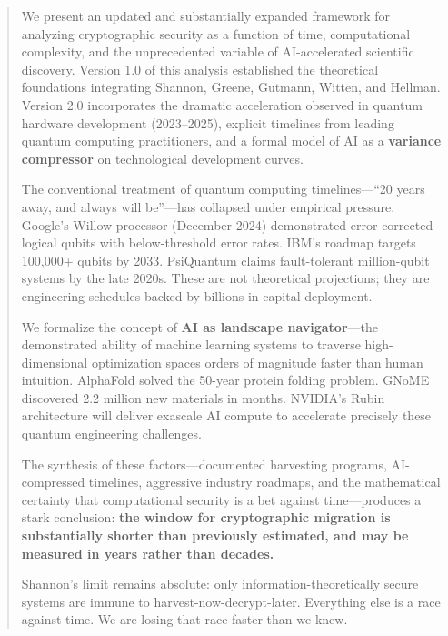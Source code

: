 \documentclass[11pt,a4paper]{article}
\begin{document}
\begin{abstract}
We present an updated and substantially expanded framework for analyzing cryptographic security as a function of time, computational complexity, and the unprecedented variable of AI-accelerated scientific discovery. Version 1.0 of this analysis established the theoretical foundations integrating Shannon, Greene, Gutmann, Witten, and Hellman. Version 2.0 incorporates the dramatic acceleration observed in quantum hardware development (2023--2025), explicit timelines from leading quantum computing practitioners, and a formal model of AI as a \textbf{variance compressor} on technological development curves.

The conventional treatment of quantum computing timelines---``20 years away, and always will be''---has collapsed under empirical pressure. Google's Willow processor (December 2024) demonstrated error-corrected logical qubits with below-threshold error rates. IBM's roadmap targets 100,000+ qubits by 2033. PsiQuantum claims fault-tolerant million-qubit systems by the late 2020s. These are not theoretical projections; they are engineering schedules backed by billions in capital deployment.

We formalize the concept of \textbf{AI as landscape navigator}---the demonstrated ability of machine learning systems to traverse high-dimensional optimization spaces orders of magnitude faster than human intuition. AlphaFold solved the 50-year protein folding problem. GNoME discovered 2.2 million new materials in months. NVIDIA's Rubin architecture will deliver exascale AI compute to accelerate precisely these quantum engineering challenges.

The synthesis of these factors---documented harvesting programs, AI-compressed timelines, aggressive industry roadmaps, and the mathematical certainty that computational security is a bet against time---produces a stark conclusion: \textbf{the window for cryptographic migration is substantially shorter than previously estimated, and may be measured in years rather than decades.}

Shannon's limit remains absolute: only information-theoretically secure systems are immune to harvest-now-decrypt-later. Everything else is a race against time. We are losing that race faster than we knew.
\end{abstract}

\tableofcontents
\newpage

\end{document}
